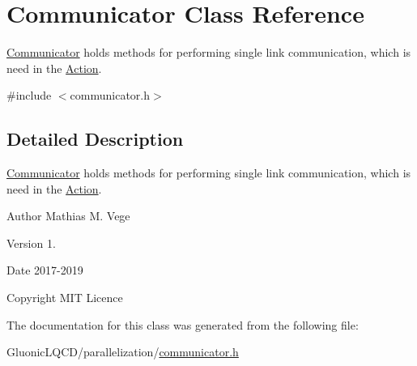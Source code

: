 \hypertarget{class_communicator}{}\section{Communicator Class Reference}
\label{class_communicator}


\mbox{\hyperlink{class_communicator}{Communicator}} holds methods for performing single link communication, which is need in the \mbox{\hyperlink{class_action}{Action}}.  




{\ttfamily \#include $<$communicator.\+h$>$}



\subsection{Detailed Description}
\mbox{\hyperlink{class_communicator}{Communicator}} holds methods for performing single link communication, which is need in the \mbox{\hyperlink{class_action}{Action}}. 

\begin{DoxyAuthor}{Author}
Mathias M. Vege 
\end{DoxyAuthor}
\begin{DoxyVersion}{Version}
1. 
\end{DoxyVersion}
\begin{DoxyDate}{Date}
2017-\/2019 
\end{DoxyDate}
\begin{DoxyCopyright}{Copyright}
M\+IT Licence 
\end{DoxyCopyright}


The documentation for this class was generated from the following file\+:\begin{DoxyCompactItemize}
\item 
Gluonic\+L\+Q\+C\+D/parallelization/\mbox{\hyperlink{communicator_8h}{communicator.\+h}}\end{DoxyCompactItemize}
